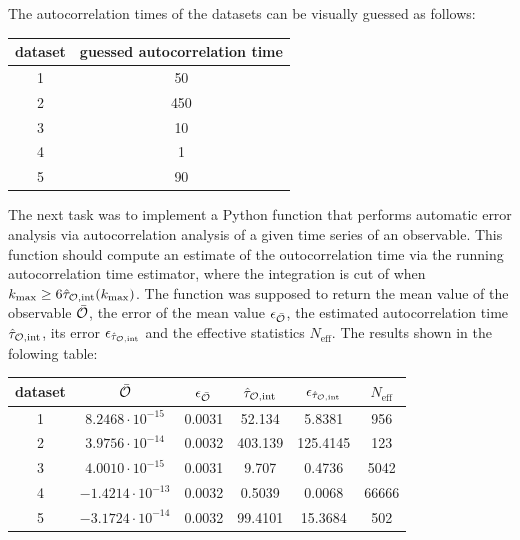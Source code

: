 \documentclass[12pt,a4paper]{scrartcl}
\begin{document}
The autocorrelation times of the datasets can be visually guessed as follows:

\begin{center}
\begin{tabular}{|c|c|}
\hline 
dataset & guessed autocorrelation time \\ 
\hline 
1 & 50 \\ 
\hline 
2 & 450 \\ 
\hline 
3 & 10 \\ 
\hline 
4 & 1 \\ 
\hline 
5 & 90 \\ 
\hline 
\end{tabular} 
\end{center}

The next task was to implement a Python function that performs automatic error analysis via autocorrelation analysis of a given time series of an observable.
This function should compute an estimate of the outocorrelation time via the running autocorrelation time estimator, where the integration is cut of when $k_\text{max} \geq 6 \hat{\tau}_{\cal{O},\text{int}}(k_\text{max})$.
The function was supposed to return the mean value of the observable $\bar{\cal O} {}$, the error of the mean value $\epsilon_{\bar{\cal O} {}}$, the estimated autocorrelation time $\hat{\tau}_{\cal{O},\text{int}}$, its error $\epsilon_{\hat{\tau}_{\cal{O},\text{int}}}$ and the effective statistics $N_\text{eff}$. The results shown in the folowing table:

\begin{center}
\begin{tabular}{|c|c|c|c|c|c|}
\hline 
dataset & $\bar{\cal O} {}$ & $\epsilon_{\bar{\cal O} {}}$ & $\hat{\tau}_{\cal{O},\text{int}}$ & $\epsilon_{\hat{\tau}_{\cal{O},\text{int}}}$ & $N_\text{eff}$ \\ 
\hline 
1 & $8.2468\cdot 10^{-15}$ & 0.0031 &  52.134 & 5.8381 & 956 \\ 
\hline 
2 & $3.9756 \cdot 10^{-14}$ & 0.0032 & 403.139 & 125.4145 & 123 \\ 
\hline 
3 & $4.0010 \cdot 10^{-15}$ & 0.0031 & 9.707 & 0.4736 & 5042 \\ 
\hline 
4 & $-1.4214 \cdot 10^{-13}$ & 0.0032 & 0.5039 & 0.0068 & 66666 \\ 
\hline 
5 & $-3.1724 \cdot 10^{-14}$ & 0.0032 & 99.4101 & 15.3684 & 502 \\ 
\hline 
\end{tabular} 
\end{center}
\end{document}
